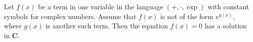 Let $f(x)$ be a term in one variable in the language $(+, \cdot, \exp)$ with constant symbols for complex numbers. Assume that $f(x)$ is not of the form $e^{g(x)}$, where $g(x)$ is another such term. Then the equation $f(x) = 0$ has a solution in $\mathbf{C}$.
